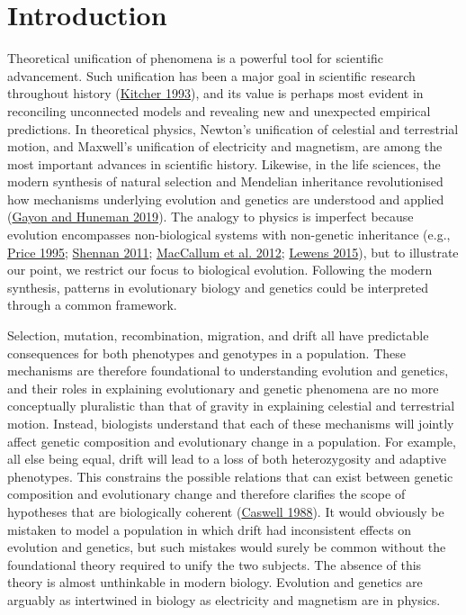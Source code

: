 \documentclass[
]{article}
\begin{document}
\hypertarget{introduction}{%
\section{Introduction}\label{introduction}}

Theoretical unification of phenomena is a powerful tool for scientific
advancement. Such unification has been a major goal in scientific
research throughout history (\protect\hyperlink{ref-Kitcher1993}{Kitcher
1993}), and its value is perhaps most evident in reconciling unconnected
models and revealing new and unexpected empirical predictions. In
theoretical physics, Newton's unification of celestial and terrestrial
motion, and Maxwell's unification of electricity and magnetism, are
among the most important advances in scientific history. Likewise, in
the life sciences, the modern synthesis of natural selection and
Mendelian inheritance revolutionised how mechanisms underlying evolution
and genetics are understood and applied
(\protect\hyperlink{ref-Gayon2019}{Gayon and Huneman 2019}). The analogy
to physics is imperfect because evolution encompasses non-biological
systems with non-genetic inheritance (e.g.,
\protect\hyperlink{ref-Price1995}{Price 1995};
\protect\hyperlink{ref-Shennan2011}{Shennan 2011};
\protect\hyperlink{ref-MacCallum2012}{MacCallum et al. 2012};
\protect\hyperlink{ref-Lewens2015}{Lewens 2015}), but to illustrate our
point, we restrict our focus to biological evolution. Following the
modern synthesis, patterns in evolutionary biology and genetics could be
interpreted through a common framework.

Selection, mutation, recombination, migration, and drift all have
predictable consequences for both phenotypes and genotypes in a
population. These mechanisms are therefore foundational to understanding
evolution and genetics, and their roles in explaining evolutionary and
genetic phenomena are no more conceptually pluralistic than that of
gravity in explaining celestial and terrestrial motion. Instead,
biologists understand that each of these mechanisms will jointly affect
genetic composition and evolutionary change in a population. For
example, all else being equal, drift will lead to a loss of both
heterozygosity and adaptive phenotypes. This constrains the possible
relations that can exist between genetic composition and evolutionary
change and therefore clarifies the scope of hypotheses that are
biologically coherent (\protect\hyperlink{ref-Caswell1988}{Caswell
1988}). It would obviously be mistaken to model a population in which
drift had inconsistent effects on evolution and genetics, but such
mistakes would surely be common without the foundational theory required
to unify the two subjects. The absence of this theory is almost
unthinkable in modern biology. Evolution and genetics are arguably as
intertwined in biology as electricity and magnetism are in physics.
\end{document}
